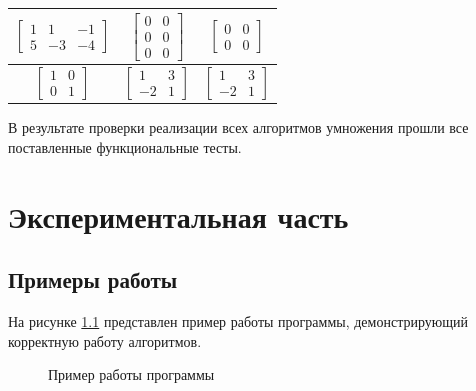\documentclass[12pt, a4paper]{report}
\begin{document}
\begin{table}[ht!]
\begin{center}
\begin{tabular}{|c|c|c|}
			$\begin{bmatrix}1 & 1 & -1\\5 & -3 & -4\end{bmatrix}$ &
			$\begin{bmatrix}0 & 0\\0 & 0\\0 & 0\end{bmatrix}$ &
			$\begin{bmatrix}0 & 0\\0 & 0\end{bmatrix}$\\\hline
			
			$\begin{bmatrix}1 & 0\\0 & 1\end{bmatrix}$ &
			$\begin{bmatrix}1 & 3\\-2 & 1\end{bmatrix}$ &
			$\begin{bmatrix}1 & 3\\-2 & 1\end{bmatrix}$\\\hline

			\end{tabular}
		\end{center}
	\end{table}

	В результате проверки реализации всех алгоритмов умножения прошли все поставленные функциональные тесты.

	\chapter{Экспериментальная часть}
	\section{Примеры работы}
	На рисунке \ref{pic:example} представлен пример работы программы, демонстрирующий корректную работу алгоритмов.
	\begin{figure}[ht!]
		\centering
		\caption{Пример работы программы}
		\label{pic:example}
	\end{figure}
	
\end{document}
